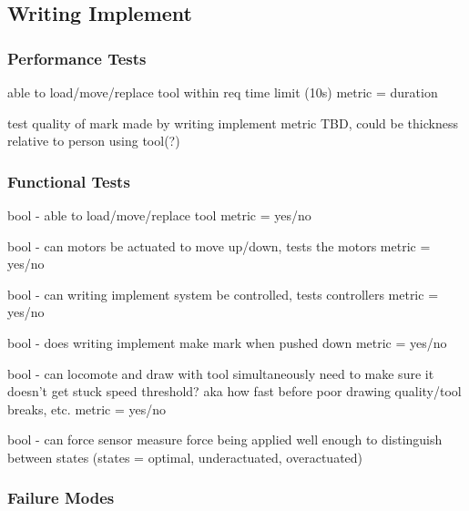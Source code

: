 
\subsection{Writing Implement}
\label{sec:verification_writing_implement}

\subsubsection{Performance Tests}
\label{sec:writing_pt}
able to load/move/replace tool within req time limit (10s)
metric = duration

test quality of mark made by writing implement
metric TBD, could be thickness relative to person using tool(?)


\subsubsection{Functional Tests}
\label{sec:writing_ft}
bool - able to load/move/replace tool
metric = yes/no

bool - can motors be actuated to move up/down, tests the motors
metric = yes/no

bool - can writing implement system be controlled, tests controllers
metric = yes/no

bool - does writing implement make mark when pushed down
metric = yes/no

bool - can locomote and draw with tool simultaneously
need to make sure it doesn't get stuck
speed threshold? aka how fast before poor drawing quality/tool breaks, etc.
metric = yes/no

bool - can force sensor measure force being applied well enough to distinguish between states (states = optimal, underactuated, overactuated)

\subsubsection{Failure Modes}
\label{sec:writing_fm}
